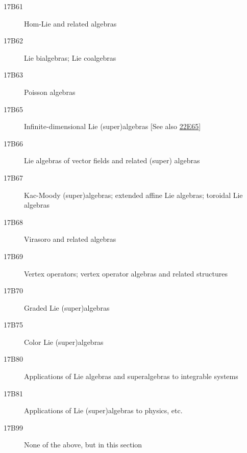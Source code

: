 \begin{description}
\item [17B61]\label{17B61} Hom-Lie and related algebras
\item [17B62]\label{17B62} Lie bialgebras; Lie coalgebras
\item [17B63]\label{17B63} Poisson algebras
\item [17B65]\label{17B65} Infinite-dimensional Lie (super)algebras [See also \hyperref[22E65]{22E65}]
\item [17B66]\label{17B66} Lie algebras of vector fields and related (super) algebras
\item [17B67]\label{17B67} Kac-Moody (super)algebras; extended affine Lie algebras; toroidal Lie algebras
\item [17B68]\label{17B68} Virasoro and related algebras
\item [17B69]\label{17B69} Vertex operators; vertex operator algebras and related structures
\item [17B70]\label{17B70} Graded Lie (super)algebras
\item [17B75]\label{17B75} Color Lie (super)algebras
\item [17B80]\label{17B80} Applications of Lie algebras and superalgebras to integrable systems
\item [17B81]\label{17B81} Applications of Lie (super)algebras to physics, etc.
\item [17B99]\label{17B99} None of the above, but in this section
\end{description}
